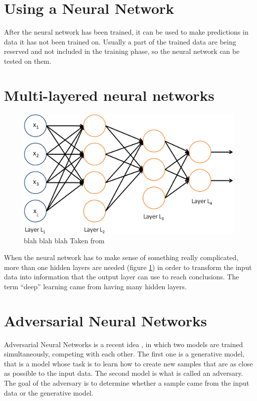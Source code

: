 \section{Using a Neural Network}
After the neural network has been trained, it can be used to make predictions in data it has not been trained on. Usually a part of the trained data are being reserved and not included in the training phase, so the neural network can be tested on them.

\section{Multi-layered neural networks}
\begin{figure}[H]
  \centering
  \includegraphics[width=\textwidth]{images/my_simplenn.png}
  \caption{blah blah blah Taken from \cite{nnarticle3}}
  \label{fig:simplenn}
\end{figure}

When the neural network has to make sense of something really complicated, more than one hidden layers are needed (figure \ref{fig:simplenn}) in order to transform the input data into information that the output layer can use to reach conclusions. The term “deep” learning came from having many hidden layers. 


\section{Adversarial Neural Networks}\label{ch:ann}
Adversarial Neural Networks is a recent idea \cite{goodfellow2014generative}, in which two models are trained simultaneously, competing with each other. 
The first one is a generative model, that is a model whose task is to learn how to create new samples that are as close as possible to the input data.
The second model is what is called an adversary. The goal of the adversary is to determine whether a sample came from the input data or the generative model.

